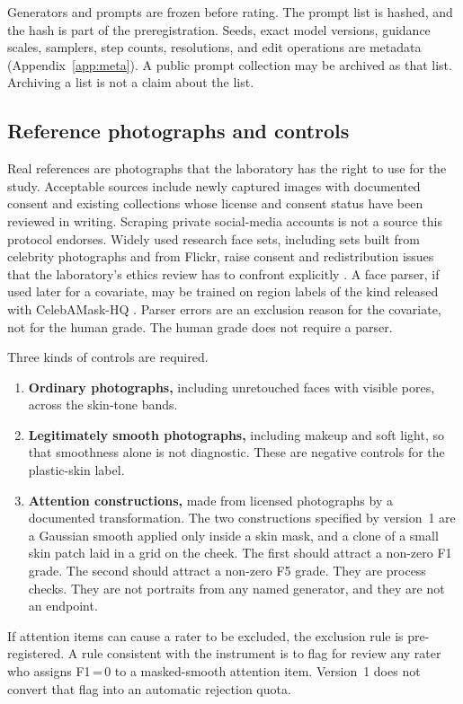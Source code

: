\documentclass[10pt,twocolumn]{article}
\begin{document}
Generators and prompts are frozen before rating. The prompt list is hashed, and the hash is part of the preregistration. Seeds, exact model versions, guidance scales, samplers, step counts, resolutions, and edit operations are metadata (Appendix~\ref{app:meta}). A public prompt collection may be archived as that list. Archiving a list is not a claim about the list.

\subsection{Reference photographs and controls}

Real references are photographs that the laboratory has the right to use for the study. Acceptable sources include newly captured images with documented consent and existing collections whose license and consent status have been reviewed in writing. Scraping private social-media accounts is not a source this protocol endorses. Widely used research face sets, including sets built from celebrity photographs and from Flickr, raise consent and redistribution issues that the laboratory's ethics review has to confront explicitly \cite{karras2019stylegan,lee2020celebamask}. A face parser, if used later for a covariate, may be trained on region labels of the kind released with CelebAMask-HQ \cite{lee2020celebamask}. Parser errors are an exclusion reason for the covariate, not for the human grade. The human grade does not require a parser.

Three kinds of controls are required.
\begin{enumerate}
  \item \textbf{Ordinary photographs,} including unretouched faces with visible pores, across the skin-tone bands.
  \item \textbf{Legitimately smooth photographs,} including makeup and soft light, so that smoothness alone is not diagnostic. These are negative controls for the plastic-skin label.
  \item \textbf{Attention constructions,} made from licensed photographs by a documented transformation. The two constructions specified by version~1 are a Gaussian smooth applied only inside a skin mask, and a clone of a small skin patch laid in a grid on the cheek. The first should attract a non-zero F1 grade. The second should attract a non-zero F5 grade. They are process checks. They are not portraits from any named generator, and they are not an endpoint.
\end{enumerate}
If attention items can cause a rater to be excluded, the exclusion rule is pre-registered. A rule consistent with the instrument is to flag for review any rater who assigns F1\,=\,0 to a masked-smooth attention item. Version~1 does not convert that flag into an automatic rejection quota.
\end{document}
